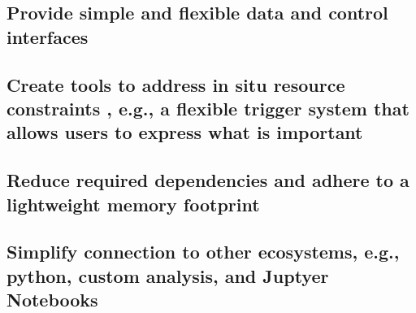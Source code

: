 \subsection{Provide simple and flexible data and control interfaces}

\subsection{Create tools to address in situ resource constraints , e.g., a flexible trigger system that allows users to express what is important}

\subsection{Reduce required dependencies and adhere to a lightweight memory footprint}

\subsection{Simplify connection to other ecosystems, e.g., python, custom analysis, and Juptyer Notebooks}

